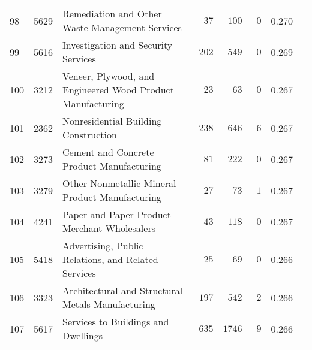 \documentclass[9pt, oneside]{article}   	%
\begin{document}
\begin{longtable}{lcp{3 in}ccccc}
98  & 5629 & Remediation and Other Waste Management Services & $\phantom{00}37$ & $\phantom{0}100$ & $\phantom{0}0$ & 0.270 \\
99  & 5616 & Investigation and Security Services & $\phantom{0}202$ & $\phantom{0}549$ & $\phantom{0}0$ & 0.269 \\
100  & 3212 & Veneer, Plywood, and Engineered Wood Product Manufacturing & $\phantom{00}23$ & $\phantom{00}63$ & $\phantom{0}0$ & 0.267 \\
101  & 2362 & Nonresidential Building Construction & $\phantom{0}238$ & $\phantom{0}646$ & $\phantom{0}6$ & 0.267 \\
102  & 3273 & Cement and Concrete Product Manufacturing & $\phantom{00}81$ & $\phantom{0}222$ & $\phantom{0}0$ & 0.267 \\
103  & 3279 & Other Nonmetallic Mineral Product Manufacturing & $\phantom{00}27$ & $\phantom{00}73$ & $\phantom{0}1$ & 0.267 \\
104  & 4241 & Paper and Paper Product Merchant Wholesalers & $\phantom{00}43$ & $\phantom{0}118$ & $\phantom{0}0$ & 0.267 \\
105  & 5418 & Advertising, Public Relations, and Related Services & $\phantom{00}25$ & $\phantom{00}69$ & $\phantom{0}0$ & 0.266 \\
106  & 3323 & Architectural and Structural Metals Manufacturing & $\phantom{0}197$ & $\phantom{0}542$ & $\phantom{0}2$ & 0.266 \\
107  & 5617 & Services to Buildings and Dwellings & $\phantom{0}635$ & $1746$ & $\phantom{0}9$ & 0.266 \\


\end{longtable}
\end{document}
